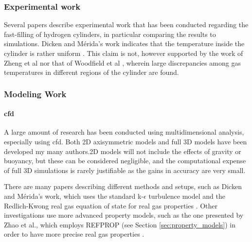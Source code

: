 \subsubsection{Experimental work}
\label{sec:experimental_work}
Several papers describe experimental work that has been conducted regarding the fast-filling of hydrogen cylinders, in particular comparing the results to simulations. Dicken and M\'erida's work indicates that the temperature inside the cylinder is rather uniform \cite{Dicken2007}. This claim is not, however supported by the work of Zheng et al \cite{Zheng2013} nor that of Woodfield et al \cite{Woodfield2008}, wherein large discrepancies among gas temperatures in different regions of the cylinder are found.



\subsubsection{Modeling Work}
\label{sec:modelingWork}

\paragraph{\gls{cfd}}


A large amount of research has been conducted using multidimensional analysis, especially using \gls{cfd}. Both 2D axisymmetric models and full 3D models have been developed my many authors.2D models will not include the effects of gravity or buoyancy, but these can be considered negligible, and the computational expense of full 3D simulations is rarely justifiable as the gains in accuracy are very small. 

There are many papers describing different methods and setups, such as Dicken and M\'erida's work, which uses the standard  k-$\epsilon$ turbulence model and the Redlich-Kwong real gas equation of state for real gas properties \cite{Dicken2007a}. 
Other investigations use more advanced property models, such as the one presented by Zhao et al., which employs REFPROP (see Section \ref{sec:property_models}) in order to have more precise real gas properties \cite{Zhao2012}.

